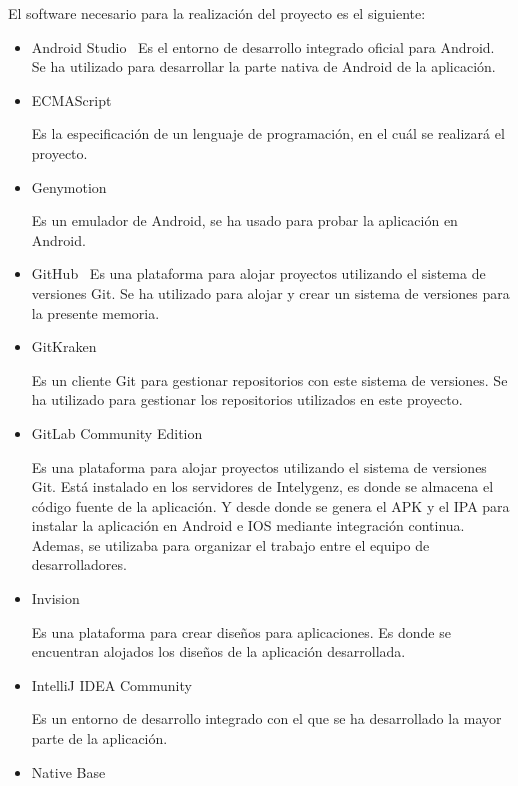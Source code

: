  El software necesario para la realización del proyecto es el siguiente:
\begin{itemize}
	\item Android Studio~\cite{ASTUDIO}
	Es el entorno de desarrollo integrado oficial para Android. Se ha utilizado para desarrollar la parte nativa 
	de Android de la aplicación.
	
	\item ECMAScript~\cite{ECMA}~\cite{ECMABOOK}
	
	Es la especificación de un lenguaje de programación, en el cuál se realizará el proyecto.
	
	\item Genymotion~\cite{GENY}
	
	Es un emulador de Android, se ha usado para probar la aplicación en Android.
	
	\item GitHub~\cite{GITHUB}
	Es una plataforma para alojar proyectos utilizando el sistema de versiones Git. Se ha utilizado para alojar 
	y crear un sistema de versiones para la presente memoria.
	
	\item GitKraken~\cite{GITKRAKEN}
	
	Es un cliente Git para gestionar repositorios con este sistema de versiones. Se ha utilizado para gestionar los 
	repositorios utilizados en este proyecto.
	
	\item GitLab Community Edition~\cite{GITLAB}
	
	Es una plataforma para alojar proyectos utilizando el sistema de versiones Git. Está instalado en los servidores de 
	Intelygenz, es donde se almacena el código fuente de la aplicación. Y desde donde se genera el APK y el IPA para 
	instalar la aplicación en Android e IOS mediante integración continua. Ademas, se utilizaba para organizar el 
	trabajo entre el equipo de desarrolladores.
	
	\item Invision~\cite{INVISION}
	
	Es una plataforma para crear diseños para aplicaciones. Es donde se encuentran alojados los diseños de la 
	aplicación desarrollada.
	
	\item IntelliJ IDEA Community~\cite{IDEA}
	
	Es un entorno de desarrollo integrado con el que se ha desarrollado la mayor parte de la aplicación.
	
	\item Native Base~\cite{NABA}
	

\end{itemize}
